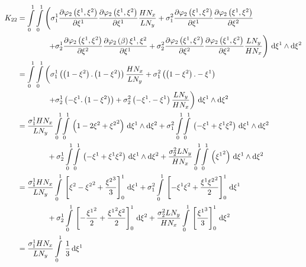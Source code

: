 \begin{equation}
  \begin{aligned}
    K_{22}&=\dintl{0}{1}\dintl{0}{1}\left(
    \conductivitytensorsymbol^{1}_{1}\delby{\lbfn{2}{\xione,\xitwo}}{\xione}
    \delby{\lbfn{2}{\xione,\xitwo}}{\xione}\dfrac{H N_{x}}{L N_{y}}+
    \conductivitytensorsymbol^{2}_{1}\delby{\lbfn{2}{\xione,\xitwo}}{\xione}
    \delby{\lbfn{2}{\xione,\xitwo}}{\xitwo}\right.\\
    &\qquad\qquad\left.+\conductivitytensorsymbol^{1}_{2}\delby{\lbfn{2}{\xione,\xitwo}}{\xitwo}
    \delby{\lbfn{2}{\beta}{\xione,\xitwo}}{\xione}+
    \conductivitytensorsymbol^{2}_{2}\delby{\lbfn{2}{\xione,\xitwo}}{\xitwo}
    \delby{\lbfn{2}{\xione,\xitwo}}{\xitwo}\dfrac{L N_{y}}{H N_{x}}\right)\infinitesimaltwo{\xione}{\xitwo}\\
    &=\dintl{0}{1}\dintl{0}{1}\left(
    \conductivitytensorsymbol^{1}_{1}\pbrac{\pbrac{1-\xitwo}.\pbrac{1-\xitwo}}\dfrac{H N_{x}}{L N_{y}}+
    \conductivitytensorsymbol^{2}_{1}\pbrac{\pbrac{1-\xitwo}.-\xione}\right.\\
    &\qquad\qquad\left.+\conductivitytensorsymbol^{1}_{2}\pbrac{-\xione.\pbrac{1-\xitwo}}+
    \conductivitytensorsymbol^{2}_{2}\pbrac{-\xione.-\xione}\dfrac{L N_{y}}{H N_{x}}\right)
    \infinitesimaltwo{\xione}{\xitwo}\\
    &=\dfrac{\conductivitytensorsymbol^{1}_{1} H N_{x}}{L N_{y}}\giint{0}{1}{0}{1}{\pbrac{1-2\xitwo+\xitwosq}}{\xione}{\xitwo}
    +\conductivitytensorsymbol^{2}_{1}\giint{0}{1}{0}{1}{\pbrac{-\xione+\xione\xitwo}}{\xione}{\xitwo}\\
    &\qquad\qquad+\conductivitytensorsymbol^{1}_{2}\giint{0}{1}{0}{1}{\pbrac{-\xione+\xione\xitwo}}{\xione}{\xitwo}
    +\dfrac{\conductivitytensorsymbol^{2}_{2} L N_{y}}{H N_{x}}\giint{0}{1}{0}{1}{\pbrac{\xionesq}}{\xione}{\xitwo} \\
    &=\dfrac{\conductivitytensorsymbol^{1}_{1} H N_{x}}{L N_{y}}\gint{0}{1}{\sqbrac{\xitwo-\xitwosq+\dfrac{\xitwocube}{3}}^{1}_{0}}{\xione}
    +\conductivitytensorsymbol^{2}_{1}\gint{0}{1}{\sqbrac{-\xione\xitwo+\dfrac{\xione\xitwosq}{2}}^{1}_{0}}{\xione}\\
    &\qquad\qquad+\conductivitytensorsymbol^{1}_{2}\gint{0}{1}{\sqbrac{-\dfrac{\xionesq}{2}+\dfrac{\xionesq\xitwo}{2}}^{1}_{0}}{\xitwo}
    +\dfrac{\conductivitytensorsymbol^{2}_{2} L N_{y}}{H N_{x}}\gint{0}{1}{\sqbrac{\dfrac{\xionecube}{3}}^{1}_{0}}{\xitwo} \\
    &=\dfrac{\conductivitytensorsymbol^{1}_{1} H N_{x}}{L N_{y}}\gint{0}{1}{\dfrac{1}{3}}{\xione}

\end{aligned}
\end{equation}
